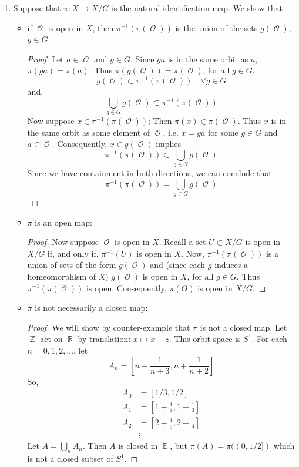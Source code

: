 \documentclass{book}
\DeclareMathOperator*{\R}{\mathbb{R}}
\DeclareMathOperator*{\E}{\mathbb{E}}
\DeclareMathOperator*{\Ocal}{\mathcal{O}}
\DeclareMathOperator*{\Z}{\mathbb{Z}}
\begin{document}
\begin{enumerate}[(1)]
    \item Suppose that $\pi : X \rightarrow X/G$ is the natural identification map. We show that 
        \begin{itemize}
            \item if $\Ocal$ is open in $X$, then $\pi^{-1}(\pi(\Ocal))$ is the union of the sets $g(\Ocal)$, $g \in G$:
                \begin{proof} Let $a\in \Ocal$ and $g\in G$.  Since $ga$ is in the same orbit as $a$, $\pi(ga)=\pi(a)$.  Thus $\pi( g(\Ocal))=\pi(\Ocal)$, for all $g\in G$,  \[g(\Ocal)\subset \pi^{-1}(\pi(\Ocal)) \quad \forall g \in G\] 
                    and, 
                    \[\bigcup_{g\in G}g(\Ocal) \subset \pi^{-1}(\pi(\Ocal))\]
                    Now suppose $x\in\pi^{-1}(\pi(\Ocal))$; Then $\pi(x)\in\pi(\Ocal)$.   Thus $x$ is in the same orbit as some element of $\Ocal$, i.e. $x=ga$ for some $g\in G$ and $a\in \Ocal$. Consequently, $x\in g(\Ocal)$ implies  \[\pi^{-1}(\pi(\Ocal))\subset\bigcup_{g\in G}g(\Ocal)\]   
                    Since we have containment in both directions, we can conclude that 
                    \[\pi^{-1}(\pi(\Ocal))=\bigcup_{g\in G} g(\Ocal)\]
                \end{proof}

            \item $\pi$ is an open map: 
                \begin{proof} Now suppose $\Ocal$ is open in $X$. Recall a set $U \subset X/G$ is open in $X/G$ if, and only if, $\pi^{-1}(U)$ is open in $X$. Now, $\pi^{-1}(\pi(\Ocal))$ is a union of sets of the form $g(\Ocal)$ and (since each $g$ induces a homeomorphism of $X$) $g(\Ocal)$ is open in $X$, for all $g\in G$.  Thus $\pi^{-1}(\pi(\Ocal))$ is open. Consequently, $\pi(O)$ is open in $X/G$. 
                \end{proof}

            \item $\pi$ is not necessarily a closed map: 
                \begin{proof} We will show by counter-example that $\pi$ is not a closed map.  Let $\Z$ act on $\R$ by translation: $x \mapsto x+z$.  This orbit space is $S^1$.  For each $n= 0,1,2,\dots$, let \[A_n=[n+\frac{1}{n+3},n+\frac{1}{n+2}]\]
                    So, 
                    \begin{align*}
                        A_0 & = [1/3,1/2] \\
                        A_1 & =[1+\frac{1}{4},1+\frac{1}{3}] \\
                        A_2 & =[2+\frac{1}{5},2+\frac{1}{4}] \\
                        & \vdots 
                    \end{align*}
                    Let $A = \bigcup_n A_n$.  Then $A$ is closed in $\E$, but $\pi(A)=\pi((0,1/2])$ which is not a closed subset of $S^1$.
                \end{proof}
        \end{itemize}


\end{enumerate}
\end{document}
